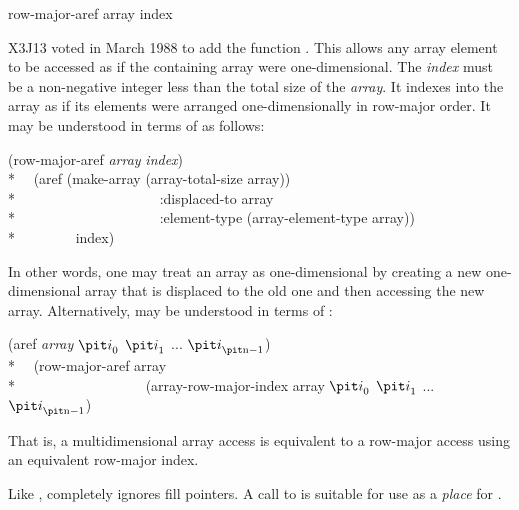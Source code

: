 \begin{new}
\begin{defun}[Function]
row-major-aref array index

X3J13 voted in March 1988
to add the function .
This allows any array element to be accessed as if the containing array
were one-dimensional.  The {\it index} must be a non-negative integer
less than the total size of the {\it array}.  It indexes into the array as
if its elements were arranged one-dimensionally in row-major order.
It may be understood in terms of  as follows:
\begin{lisp}
(row-major-aref {\it array} {\it index}) \EQ \\*
~~(aref (make-array (array-total-size array)) \\*
~~~~~~~~~~~~~~~~~~~~:displaced-to array \\*
~~~~~~~~~~~~~~~~~~~~:element-type (array-element-type array)) \\*
~~~~~~~~index)
\end{lisp}
In other words, one may treat an array as one-dimensional by creating
a new one-dimensional array that is displaced to the old one and then
accessing the new array.
Alternatively,  may be understood in terms of :
\begin{lisp}
(aref {\it array} ${\it i}_0$ ${\it i}_1$ ... ${\it i}_{\hbox{\scriptsize\it n}-1}$) \EQ \\*
~~(row-major-aref array \\*
~~~~~~~~~~~~~~~~~~(array-row-major-index array ${\it i}_0$ ${\it i}_1$ ... ${\it i}_{\hbox{\scriptsize\it n}-1}$)
\end{lisp}
That is, a multidimensional array access is equivalent to a row-major access
using an equivalent row-major index.

Like ,  completely ignores fill pointers.
A call to  is suitable for use as a {\it place} for .


\end{defun}
\end{new}
